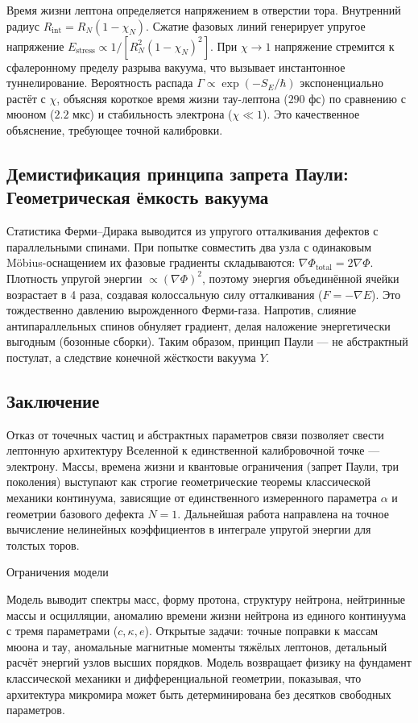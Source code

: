 \documentclass[11pt,a4paper]{article}
\begin{document}
Время жизни лептона определяется напряжением в отверстии тора. Внутренний радиус \(R_{\text{int}} = R_N (1 - \chi_N)\). Сжатие фазовых линий генерирует упругое напряжение \(E_{\text{stress}} \propto 1/[R_N^2 (1-\chi_N)^2]\). При \(\chi \to 1\) напряжение стремится к сфалеронному пределу разрыва вакуума, что вызывает инстантонное туннелирование. Вероятность распада \(\Gamma \propto \exp(-S_E/\hbar)\) экспоненциально растёт с \(\chi\), объясняя короткое время жизни тау-лептона (\(290\) фс) по сравнению с мюоном (\(2.2\) мкс) и стабильность электрона (\(\chi \ll 1\)). Это качественное объяснение, требующее точной калибровки.

\subsection{Демистификация принципа запрета Паули: Геометрическая ёмкость вакуума}

Статистика Ферми–Дирака выводится из упругого отталкивания дефектов с параллельными спинами. При попытке совместить два узла с одинаковым Möbius-оснащением их фазовые градиенты складываются: \(\nabla \Phi_{\text{total}} = 2\nabla \Phi\). Плотность упругой энергии \(\propto (\nabla \Phi)^2\), поэтому энергия объединённой ячейки возрастает в 4 раза, создавая колоссальную силу отталкивания (\(F = -\nabla E\)). Это тождественно давлению вырожденного Ферми-газа. Напротив, слияние антипараллельных спинов обнуляет градиент, делая наложение энергетически выгодным (бозонные сборки). Таким образом, принцип Паули — не абстрактный постулат, а следствие конечной жёсткости вакуума \(Y\).

\subsection{Заключение}

Отказ от точечных частиц и абстрактных параметров связи позволяет свести лептонную архитектуру Вселенной к единственной калибровочной точке — электрону. Массы, времена жизни и квантовые ограничения (запрет Паули, три поколения) выступают как строгие геометрические теоремы классической механики континуума, зависящие от единственного измеренного параметра \(\alpha\) и геометрии базового дефекта \(N=1\). Дальнейшая работа направлена на точное вычисление нелинейных коэффициентов в интеграле упругой энергии для толстых торов.
	
Ограничения модели

Модель выводит спектры масс, форму протона, структуру нейтрона, нейтринные массы и осцилляции, аномалию времени жизни нейтрона из единого континуума с тремя параметрами ($c,\kappa,e$). Открытые задачи: точные поправки к массам мюона и тау, аномальные магнитные моменты тяжёлых лептонов, детальный расчёт энергий узлов высших порядков. Модель возвращает физику на фундамент классической механики и дифференциальной геометрии, показывая, что архитектура микромира может быть детерминирована без десятков свободных параметров.
	
\end{document}
